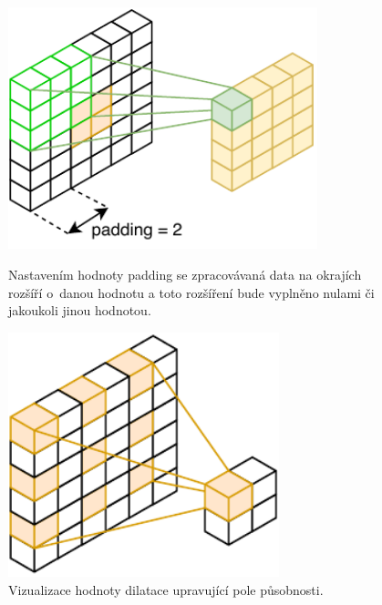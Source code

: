 \begin{figure}[H]
    \centering
    \begin{minipage}{0.45\textwidth}
        \centering
        \includegraphics[width=0.8\textwidth]{obrazky-figures/padding.pdf}
        \caption{\label{fig:conv_padding}Nastavením hodnoty padding se zpracovávaná data na okrajích rozšíří o~danou hodnotu a toto rozšíření bude vyplněno nulami či jakoukoli jinou hodnotou.}
    \end{minipage}\hfill
    \begin{minipage}{0.45\textwidth}
        \centering
        \includegraphics[width=0.7\textwidth]{obrazky-figures/cnndilation.pdf}
        \caption{\label{fig:conv_dilation}Vizualizace hodnoty dilatace upravující pole působnosti.}
    \end{minipage}
\end{figure}


